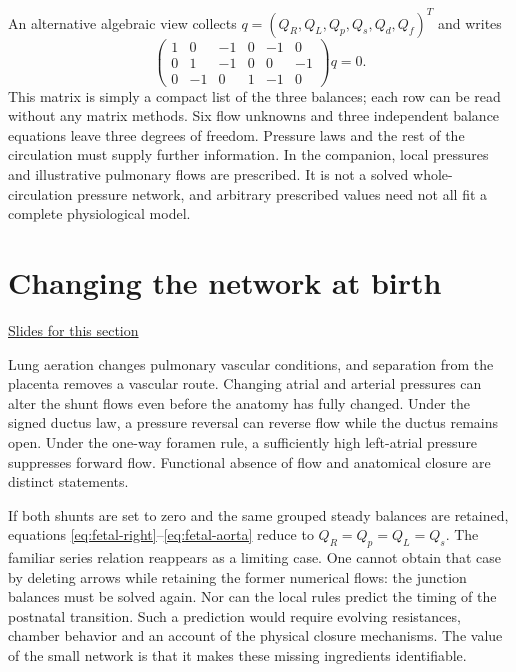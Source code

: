 \documentclass[11pt,letterpaper]{article}
\theoremstyle{definition}\newtheorem{definition}{Definition}\newtheorem{example}{Example}
\numberwithin{equation}{section}
\begin{document}
An alternative algebraic view collects $q=(Q_R,Q_L,Q_p,Q_s,Q_d,Q_f)^T$ and writes
\begin{equation}
\begin{pmatrix}
1&0&-1&0&-1&0\\
0&1&-1&0&0&-1\\
0&-1&0&1&-1&0
\end{pmatrix}q=0.
\end{equation}
This matrix is simply a compact list of the three balances; each row can be read without any matrix methods. Six flow unknowns and three independent balance equations leave three degrees of freedom. Pressure laws and the rest of the circulation must supply further information. In the companion, local pressures and illustrative pulmonary flows are prescribed. It is not a solved whole-circulation pressure network, and arbitrary prescribed values need not all fit a complete physiological model.
\section{Changing the network at birth}
\hypertarget{note-changing-the-network-at-birth}{}\label{note:changing-the-network-at-birth}
{\small \href{slides.html\#frame=the-transition-changes-both-pressures-and-routes\&step=1}{Slides for this section}}\par
Lung aeration changes pulmonary vascular conditions, and separation from the placenta removes a vascular route. Changing atrial and arterial pressures can alter the shunt flows even before the anatomy has fully changed. Under the signed ductus law, a pressure reversal can reverse flow while the ductus remains open. Under the one-way foramen rule, a sufficiently high left-atrial pressure suppresses forward flow. Functional absence of flow and anatomical closure are distinct statements.

If both shunts are set to zero and the same grouped steady balances are retained, equations \eqref{eq:fetal-right}--\eqref{eq:fetal-aorta} reduce to $Q_R=Q_p=Q_L=Q_s$. The familiar series relation reappears as a limiting case. One cannot obtain that case by deleting arrows while retaining the former numerical flows: the junction balances must be solved again. Nor can the local rules predict the timing of the postnatal transition. Such a prediction would require evolving resistances, chamber behavior and an account of the physical closure mechanisms. The value of the small network is that it makes these missing ingredients identifiable.
\bigskip
\end{document}
